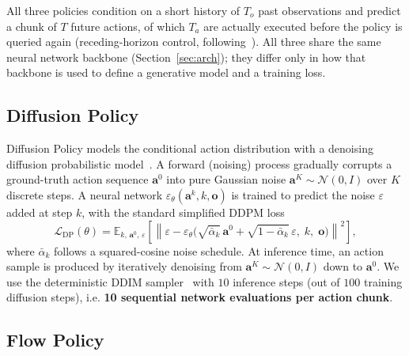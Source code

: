 \documentclass[11pt]{article}
\begin{document}
All three policies condition on a short history of $T_o$ past observations
and predict a chunk of $T$ future actions, of which $T_a$ are actually
executed before the policy is queried again (receding-horizon control,
following~\cite{chi2023diffusion}). All three share the same neural network
backbone (Section~\ref{sec:arch}); they differ only in how that backbone is
used to define a generative model and a training loss.

\subsection{Diffusion Policy}
\label{sec:dp}

Diffusion Policy models the conditional action distribution with a denoising
diffusion probabilistic model~\cite{ho2020ddpm}. A forward (noising) process
gradually corrupts a ground-truth action sequence $\mathbf{a}^0$ into pure
Gaussian noise $\mathbf{a}^{K}\sim\mathcal{N}(0,I)$ over $K$ discrete steps.
A neural network $\varepsilon_\theta(\mathbf{a}^k, k, \mathbf{o})$ is trained
to predict the noise $\varepsilon$ added at step $k$, with the standard
simplified DDPM loss
\begin{equation}
\mathcal{L}_{\text{DP}}(\theta) = \mathbb{E}_{k,\,\mathbf{a}^0,\,\varepsilon}
\left[\left\| \varepsilon - \varepsilon_\theta\big(\sqrt{\bar\alpha_k}\,\mathbf{a}^0
+ \sqrt{1-\bar\alpha_k}\,\varepsilon,\; k,\; \mathbf{o}\big) \right\|^2\right],
\end{equation}
where $\bar\alpha_k$ follows a squared-cosine noise schedule. At inference
time, an action sample is produced by iteratively denoising from
$\mathbf{a}^{K}\sim\mathcal{N}(0,I)$ down to $\mathbf{a}^0$. We use the
deterministic DDIM sampler~\cite{song2021ddim} with $10$ inference steps
(out of $100$ training diffusion steps), i.e. \textbf{10 sequential network
evaluations per action chunk}.

\subsection{Flow Policy}
\label{sec:flow}
\end{document}
